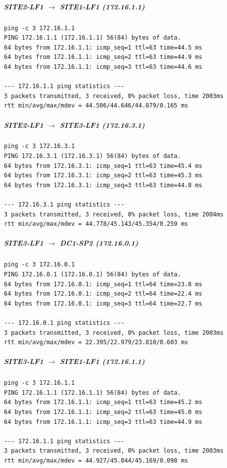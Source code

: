 \documentclass[11pt]{article}
\begin{document}
\subparagraph{SITE2-LF1 $\rightarrow$ SITE1-LF1 (172.16.1.1)}

\begin{verbatim}
ping -c 3 172.16.1.1
PING 172.16.1.1 (172.16.1.1) 56(84) bytes of data.
64 bytes from 172.16.1.1: icmp_seq=1 ttl=63 time=44.5 ms
64 bytes from 172.16.1.1: icmp_seq=2 ttl=63 time=44.9 ms
64 bytes from 172.16.1.1: icmp_seq=3 ttl=63 time=44.6 ms

--- 172.16.1.1 ping statistics ---
3 packets transmitted, 3 received, 0% packet loss, time 2003ms
rtt min/avg/max/mdev = 44.506/44.646/44.879/0.165 ms
\end{verbatim}

\subparagraph{SITE2-LF1 $\rightarrow$ SITE3-LF1 (172.16.3.1)}

\begin{verbatim}
ping -c 3 172.16.3.1
PING 172.16.3.1 (172.16.3.1) 56(84) bytes of data.
64 bytes from 172.16.3.1: icmp_seq=1 ttl=63 time=45.4 ms
64 bytes from 172.16.3.1: icmp_seq=2 ttl=63 time=45.3 ms
64 bytes from 172.16.3.1: icmp_seq=3 ttl=63 time=44.8 ms

--- 172.16.3.1 ping statistics ---
3 packets transmitted, 3 received, 0% packet loss, time 2004ms
rtt min/avg/max/mdev = 44.778/45.143/45.354/0.259 ms
\end{verbatim}

\subparagraph{SITE3-LF1 $\rightarrow$ DC1-SP2 (172.16.0.1)}

\begin{verbatim}
ping -c 3 172.16.0.1
PING 172.16.0.1 (172.16.0.1) 56(84) bytes of data.
64 bytes from 172.16.0.1: icmp_seq=1 ttl=64 time=23.8 ms
64 bytes from 172.16.0.1: icmp_seq=2 ttl=64 time=22.4 ms
64 bytes from 172.16.0.1: icmp_seq=3 ttl=64 time=22.7 ms

--- 172.16.0.1 ping statistics ---
3 packets transmitted, 3 received, 0% packet loss, time 2003ms
rtt min/avg/max/mdev = 22.395/22.979/23.810/0.603 ms
\end{verbatim}

\subparagraph{SITE3-LF1 $\rightarrow$ SITE1-LF1 (172.16.1.1)}

\begin{verbatim}
ping -c 3 172.16.1.1
PING 172.16.1.1 (172.16.1.1) 56(84) bytes of data.
64 bytes from 172.16.1.1: icmp_seq=1 ttl=63 time=45.2 ms
64 bytes from 172.16.1.1: icmp_seq=2 ttl=63 time=45.0 ms
64 bytes from 172.16.1.1: icmp_seq=3 ttl=63 time=44.9 ms

--- 172.16.1.1 ping statistics ---
3 packets transmitted, 3 received, 0% packet loss, time 2003ms
rtt min/avg/max/mdev = 44.927/45.044/45.169/0.098 ms
\end{verbatim}
\end{document}
